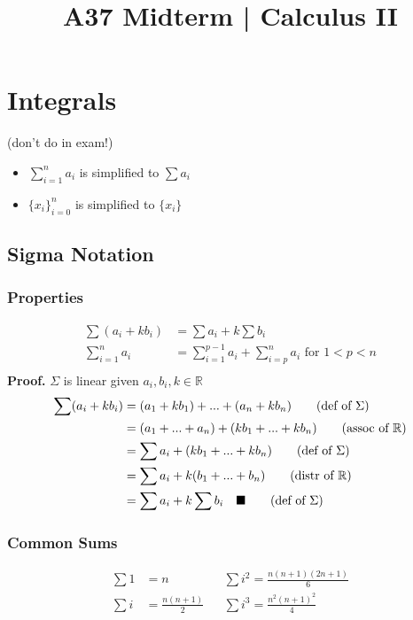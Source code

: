 

\title{A37 Midterm | Calculus II}

\maketitle
\tableofcontents
\section{Integrals}
	(don't do in exam!)
	\begin{itemize}
		\item $\displaystyle\sum_{i=1}^na_i$ is simplified to $\displaystyle\sum a_i$\\
		\item $\displaystyle\{x_i\}_{i=0}^n$ is simplified to $\displaystyle\{x_i\}$\\
	\end{itemize}
	\subsection{Sigma Notation}
		\subsubsection{Properties}
			\begin{theorem}
				\begin{align*}
					\sum(a_i+kb_i)&=\sum a_i+k\sum b_i\\
					\sum_{i=1}^na_i&=\sum_{i=1}^{p-1}a_i+\sum_{i=p}^na_i\text{ for }1<p<n\\
				\end{align*}
				\textbf{Proof.} $\Sigma$ is linear 
				given $a_i,b_i,k\in\mathbb{R}$
				\begin{align*}
					\sum(a_i+kb_i)&=(a_1+kb_1)+...+(a_n+kb_n)\tag*{(def of $\Sigma$)}\\
					&=(a_1+...+a_n)+(kb_1+...+kb_n)\tag*{(assoc of $\mathbb{R}$)}\\
					&=\sum a_i+(kb_1+...+kb_n)\tag*{(def of $\Sigma$)}\\
					&=\sum a_i+k(b_1+...+b_n)\tag*{(distr of $\mathbb{R}$)}\\
					&=\sum a_i+k\sum b_i\quad\blacksquare\tag*{(def of $\Sigma$)}\\
				\end{align*}
			\end{theorem}
		\subsubsection{Common Sums}
			\begin{theorem}\begin{align*}
				\sum1&=n&&\sum i^2=\frac{n(n+1)(2n+1)}6\\
				\sum i&=\frac{n(n+1)}2&&\sum i^3=\frac{n^2(n+1)^2}4
			\end{align*}\end{theorem}
